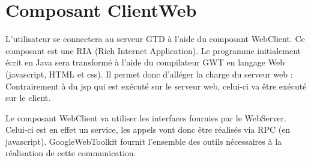 
\section{Composant ClientWeb}
L'utilisateur se connectera au serveur GTD à l'aide du composant WebClient. Ce
composant est une RIA (Rich Internet Application). Le programme initialement écrit en Java sera transformé à l'aide du compilateur GWT en langage Web (javascript, HTML et css). Il permet donc
d'alléger la charge du serveur web : Contrairement à du
jsp qui est exécuté sur le serveur web, celui-ci va être exécuté sur le client.

\medskip

Le composant WebClient va utiliser les interfaces fournies par le
WebServer. Celui-ci est en effet un service, les appels vont donc être réalisés
via RPC (en javascript). GoogleWebToolkit fournit l'ensemble des outils nécessaires à la
réalisation de cette communication.